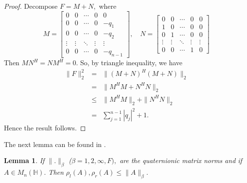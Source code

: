 \documentclass [12pt]{article}
\newtheorem{lemma}{Lemma}
\begin{document}
\begin{proof}
    Decompose $F=M+N,$ where \\
    \[M = 
\begin{bmatrix}
0 & 0 & \cdots & 0 & 0 \\
0 & 0 & \cdots & 0 & -q_{1} \\
0 & 0 & \cdots & 0 & -q_{2} \\
\vdots & \vdots & \ddots & \vdots & \vdots \\
0 & 0 & \cdots & 0 & -q_{n-1}
\end{bmatrix}
,
\quad
N = 
\begin{bmatrix}
0 & 0 & \cdots & 0 & 0 \\
1 & 0 & \cdots & 0 & 0 \\
0 & 1 & \cdots & 0 & 0 \\
\vdots & \vdots & \ddots & \vdots & \vdots \\
0 & 0 & \cdots & 1 & 0
\end{bmatrix}\]
Then $MN^{H}=NM^{H}=0.$ So, by triangle inequality, we have 
\begin{eqnarray*}
    \|F\|^2_{2} &=&\|(M +N )^{H}(M +N)\|_{2}\\ &=& \|M^{H}M+N^{H}N\|_{2}\\&\le&  \|M^{H}M\|_{2} + \|N^{H}N\|_{2} \\&=&  \sum_{j=1}^{n-1}|q_{j}|^{2}+1.
\end{eqnarray*}
Hence the result follows.
\end{proof}
\noindent The next lemma can be found in \cite{ASS}.
\begin{lemma}
    If $\|.\|_{\beta}$ ($\beta=1,2,\infty, F),$ are the quaternionic matrix norms and if $A \in  M_{n}(\mathbb{H}).$ Then
    $\rho_{l}(A),\rho_{r}(A)\le \|A\|_{\beta}$.
\end{lemma}
\end{document}

